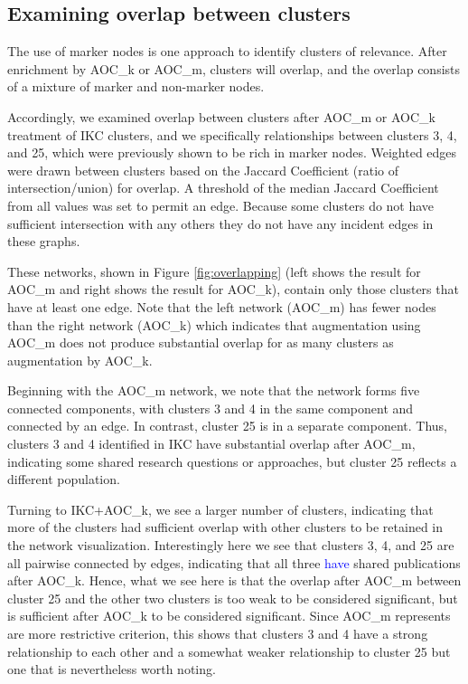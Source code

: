 \documentclass[12pt, oneside]{article}   	%
\begin{document}
{\clearpage
	
\subsection{Examining overlap between clusters}

The use of marker nodes is one approach to identify clusters of relevance. After enrichment by AOC\_k or AOC\_m, clusters will overlap, and the overlap consists of 
a mixture of marker and non-marker nodes.   

Accordingly, we examined overlap between clusters after AOC\_m or AOC\_k treatment of IKC clusters, and we specifically relationships between clusters 3, 4, and 25, which were previously shown to be rich in marker nodes. Weighted edges were drawn between clusters based on the Jaccard Coefficient (ratio of intersection/union) for overlap. A threshold of the median Jaccard Coefficient from all values was set to permit an edge. Because some clusters do not have sufficient intersection with any others  they do not have any incident edges in these graphs.

These networks, shown in Figure \ref{fig:overlapping} (left shows the result for AOC\_m and right shows the result for AOC\_k), contain only those clusters that have at least
one edge. Note that  the left network (AOC\_m) has fewer nodes than the right network (AOC\_k) which indicates that augmentation using AOC\_m does not produce substantial 
overlap for as many clusters as augmentation by AOC\_k.

Beginning with the AOC\_m network, we note that the network forms five connected components, with clusters 3 and 4  in the same component and connected by an edge.
In contrast, cluster 25 is in a separate component. Thus, clusters 3 and 4 identified in IKC have substantial overlap after AOC\_m, indicating some shared research questions or approaches, but
cluster 25 reflects a different population. 

Turning to IKC+AOC\_k, we see a larger number of clusters, indicating that more of the clusters had sufficient overlap with other clusters to be retained in the network visualization. 
Interestingly here we see that clusters 3, 4, and 25 are all pairwise connected by edges, indicating that all three \textcolor{blue}{have}  shared publications after AOC\_k. 
Hence,  what we see here is that the overlap after AOC\_m between cluster 25 and the other two clusters is too weak to be considered significant, but is
sufficient  after AOC\_k to be considered significant.
Since AOC\_m represents are more restrictive criterion, this shows that clusters 3 and 4 have a strong relationship  to each other and a somewhat weaker relationship to cluster 25 but one that is nevertheless worth noting.  


}
\end{document}
